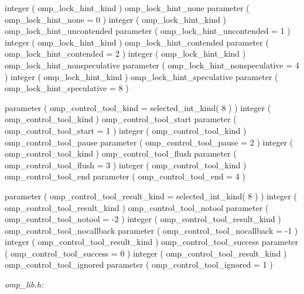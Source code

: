 {\begin{codepar}
     integer ( omp\_lock\_hint\_kind ) omp\_lock\_hint\_none
     parameter ( omp\_lock\_hint\_none = 0 )
     integer ( omp\_lock\_hint\_kind ) omp\_lock\_hint\_uncontended
     parameter ( omp\_lock\_hint\_uncontended = 1 )
     integer ( omp\_lock\_hint\_kind ) omp\_lock\_hint\_contended
     parameter ( omp\_lock\_hint\_contended = 2 )
     integer ( omp\_lock\_hint\_kind ) omp\_lock\_hint\_nonspeculative
     parameter ( omp\_lock\_hint\_nonspeculative = 4 )
     integer ( omp\_lock\_hint\_kind ) omp\_lock\_hint\_speculative
     parameter ( omp\_lock\_hint\_speculative = 8 )
\begin{samepage}
     parameter ( omp\_control\_tool\_kind = selected\_int\_kind( 8 ) )
     integer ( omp\_control\_tool\_kind ) omp\_control\_tool\_start 
     parameter ( omp\_control\_tool\_start = 1 )
     integer ( omp\_control\_tool\_kind ) omp\_control\_tool\_pause 
     parameter ( omp\_control\_tool\_pause = 2 )
     integer ( omp\_control\_tool\_kind ) omp\_control\_tool\_flush 
     parameter ( omp\_control\_tool\_flush = 3 )
     integer ( omp\_control\_tool\_kind ) omp\_control\_tool\_end 
     parameter ( omp\_control\_tool\_end = 4 )
\end{samepage}
\begin{samepage}
     parameter ( omp\_control\_tool\_result\_kind = selected\_int\_kind( 8 ) )
     integer ( omp\_control\_tool\_result\_kind ) omp_control_tool_notool 
     parameter ( omp_control_tool_notool = -2 )
     integer ( omp\_control\_tool\_result\_kind ) omp_control_tool_nocallback
     parameter ( omp_control_tool_nocallback = -1 )
     integer ( omp\_control\_tool\_result\_kind ) omp_control_tool_success
     parameter ( omp_control_tool_success = 0 )
     integer ( omp\_control\_tool\_result\_kind ) omp_control_tool_ignored 
     parameter ( omp_control_tool_ignored = 1 )
\end{samepage}
\end{codepar}}

\emph{omp\_lib.h:}

